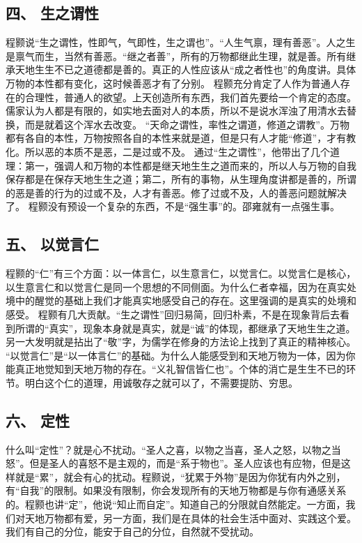 \documentclass{article}
\begin{document}
\subsection{四、	生之谓性}
程颢说“生之谓性，性即气，气即性，生之谓也”。“人生气禀，理有善恶”。人之生是禀气而生，当然有善恶。“继之者善”，所有的万物都继此生理，就是善。所有继承天地生生不已之道德都是善的。真正的人性应该从“成之者性也”的角度讲。具体万物的本性都有变化，这时候善恶才有了分别。
程颢充分肯定了人作为普通人存在的合理性，普通人的欲望。上天创造所有东西，我们首先要给一个肯定的态度。儒家认为人都是有限的，如实地去面对人的本质，所以不是说水浑浊了用清水去替换，而是就着这个浑水去改变。
“天命之谓性，率性之谓道，修道之谓教”。万物都有各自的本性，万物按照各自的本性来就是道，但是只有人才能“修道”，才有教化。所以恶的本质不是恶，二是过或不及。
通过“生之谓性”，他带出了几个道理：第一，强调人和万物的本性都是继天地生生之道而来的，所以人与万物的自我保存都是在保存天地生生之道；第二，所有的事物，从生理角度讲都是善的，所谓的恶是善的行为的过或不及，人才有善恶。修了过或不及，人的善恶问题就解决了。
程颢没有预设一个复杂的东西，不是“强生事”的。邵雍就有一点强生事。
\subsection{五、	以觉言仁}
程颢的“仁”有三个方面：以一体言仁，以生意言仁，以觉言仁。以觉言仁是核心，以生意言仁和以觉言仁是同一个思想的不同侧面。为什么仁者幸福，因为在真实处境中的醒觉的基础上我们才能真实地感受自己的存在。这里强调的是真实的处境和感受。
程颢有几大贡献。“生之谓性”回归易简，回归朴素，不是在现象背后去看到所谓的“真实”，现象本身就是真实，就是“诚”的体现，都继承了天地生生之道。另一大发明就是拈出了“敬”字，为儒学在修身的方法论上找到了真正的精神核心。
“以觉言仁”是“以一体言仁”的基础。为什么人能感受到和天地万物为一体，因为你能真正地觉知到天地万物的存在。“义礼智信皆仁也”。个体的消亡是生生不已的环节。明白这个仁的道理，用诚敬存之就可以了，不需要提防、穷思。
\subsection{六、	定性}
什么叫“定性”？就是心不扰动。“圣人之喜，以物之当喜，圣人之怒，以物之当怒”。但是圣人的喜怒不是主观的，而是“系于物也”。圣人应该也有应物，但是这样就是“累”，就会有心的扰动。程颢说，“犹累于外物”是因为你犹有内外之别，有“自我”的限制。如果没有限制，你会发现所有的天地万物都是与你有通感关系的。程颢也讲“定”，他说“知止而自定”。知道自己的分限就自然能定。一方面，我们对天地万物都有爱，另一方面，我们是在具体的社会生活中面对、实践这个爱。我们有自己的分位，能安于自己的分位，自然就不受扰动。
\end{document}
